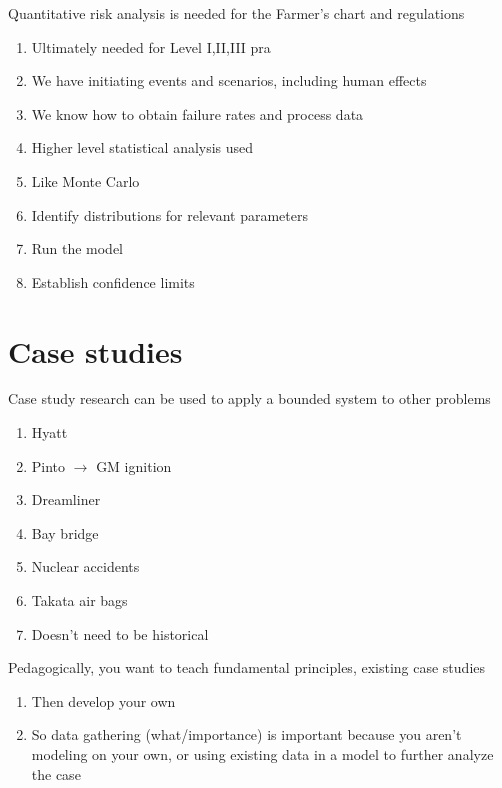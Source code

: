 \documentclass[aspectratio=1610,pdftex,dvipsnames,compress,xcolor={dvipsnames}]{beamer}
\newcommand{\acs}{\acrshort} %
\begin{document}
\begin{frame}{Quantitative risk analysis is needed for the Farmer's chart and regulations}
    \begin{enumerate}[series=outerlist,topsep=0pt,itemsep=15pt,leftmargin=*,label=(\arabic*)]
        \item[]Ultimately needed for Level I,II,III \acs{pra}
        \item[]We have initiating events and scenarios, including human effects
        \item[]We know how to obtain failure rates and process data
        \item[]Higher level statistical analysis used
        \item[]Like Monte Carlo
        \item[]Identify distributions for relevant parameters
        \item[]Run the model
        \item[]Establish confidence limits
    \end{enumerate}
\end{frame}


\section{Case studies}


\addtocounter{framenumber}{-1}
\begin{frame}{Case study research can be used to apply a bounded system to other problems}
    \begin{enumerate}[series=outerlist,topsep=0pt,itemsep=15pt,leftmargin=*,label=(\arabic*)]
        \item[]Hyatt
        \item[]Pinto $\rightarrow$ GM ignition
        \item[]Dreamliner
        \item[]Bay bridge
        \item[]Nuclear accidents
        \item[]Takata air bags
        \item[]Doesn't need to be historical
    \end{enumerate}
\end{frame}


\begin{frame}{Pedagogically, you want to teach fundamental principles, existing case studies}
    \begin{enumerate}[series=outerlist,topsep=0pt,itemsep=21pt,leftmargin=*,label=(\arabic*)]
        \item[]Then develop your own
        \item[]So data gathering (what/importance) is important because you aren't modeling on your own, or using existing data in a model to further analyze the case
    \end{enumerate}
\end{frame}
\end{document}
